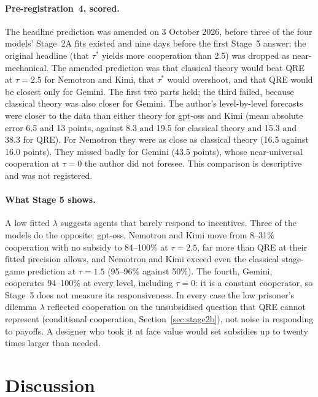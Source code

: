 \documentclass[11pt]{article}
\theoremstyle{definition}
\theoremstyle{remark}
\newcommand{\lam}{\lambda}
\begin{document}
\paragraph{Pre-registration~4, scored.} The headline prediction was amended on 3 October 2026,
before three of the four models' Stage~2A fits existed and nine days before the first Stage~5
answer; the original headline (that $\tau^*$ yields more cooperation than 2.5) was dropped as
near-mechanical. The amended prediction was that classical theory would beat QRE at $\tau=2.5$
for Nemotron and Kimi, that $\tau^*$ would overshoot, and
that QRE would be closest only for Gemini. The first two parts held; the third failed, because
classical theory was also closer for Gemini. The author's level-by-level forecasts were closer
to the data than either theory for gpt-oss and Kimi (mean absolute error 6.5 and 13 points,
against 8.3 and 19.5 for classical theory and 15.3 and 38.3 for QRE). For Nemotron they were as
close as classical theory (16.5 against 16.0 points). They missed badly for Gemini (43.5 points),
whose near-universal cooperation at $\tau=0$ the author did not foresee. This comparison
is descriptive and was not registered.

\paragraph{What Stage 5 shows.} A low fitted $\lam$ suggests agents that barely respond to
incentives. Three of the models do the opposite: gpt-oss, Nemotron and Kimi move from 8--31\%
cooperation with no subsidy to 84--100\% at $\tau=2.5$, far more than QRE at their fitted
precision allows, and Nemotron and Kimi exceed even the classical stage-game prediction at
$\tau=1.5$ (95--96\% against 50\%). The fourth, Gemini, cooperates 94--100\% at every level,
including $\tau=0$: it is a constant cooperator, so Stage~5 does not measure its responsiveness.
In every case the low prisoner's dilemma $\lam$ reflected cooperation on the unsubsidised question
that QRE cannot represent (conditional cooperation, Section~\ref{sec:stage2b}), not noise in
responding to payoffs. A designer who took it at face value would set subsidies up to twenty
times larger than needed.

\section{Discussion}\label{sec:discussion}
\end{document}
